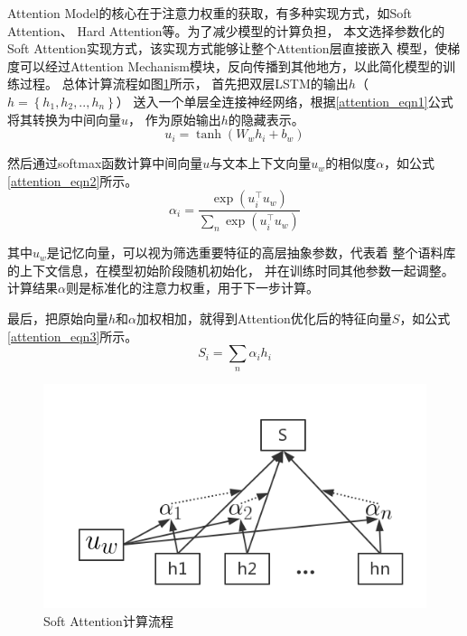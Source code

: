 Attention Model的核心在于注意力权重的获取，有多种实现方式，如Soft Attention、
Hard Attention等。为了减少模型的计算负担，
本文选择参数化的Soft Attention实现方式，该实现方式能够让整个Attention层直接嵌入
模型，使梯度可以经过Attention Mechanism模块，反向传播到其他地方，以此简化模型的训练过程。
总体计算流程如图\ref{Soft_Attention}所示，
首先把双层LSTM的输出$h$（$h=\left \{ h_1,h_2,..,h_n\right\}$）
送入一个单层全连接神经网络，根据\ref{attention_eqn1}公式将其转换为中间向量$u$，
作为原始输出$h$的隐藏表示。
\begin{equation}
    u_i=\tanh\left ( W_wh_i+b_w \right )
    \label{attention_eqn1}
\end{equation}

然后通过softmax函数计算中间向量$u$与文本上下文向量$u_w$的相似度$\alpha$，如公式\ref{attention_eqn2}所示。
\begin{equation}
    \alpha_i=\frac{\exp\left ( u_{i}^{\top }u_w \right )}{\sum_n\exp\left ( u_{i}^{\top }u_w \right )}
    \label{attention_eqn2}
\end{equation}

其中$u_w$是记忆向量，可以视为筛选重要特征的高层抽象参数，代表着
整个语料库的上下文信息，在模型初始阶段随机初始化，
并在训练时同其他参数一起调整。计算结果$\alpha$则是标准化的注意力权重，用于下一步计算。

最后，把原始向量$h$和$\alpha$加权相加，就得到Attention优化后的特征向量$S$，如公式\ref{attention_eqn3}所示。
\begin{equation}
    S_i=\sum_n\alpha_ih_i
    \label{attention_eqn3}
\end{equation}
\begin{figure}[h]
    \includegraphics[scale=0.5]{picture/Attention.png}
    \caption{Soft Attention计算流程}
    \label{Soft_Attention}
\end{figure}

